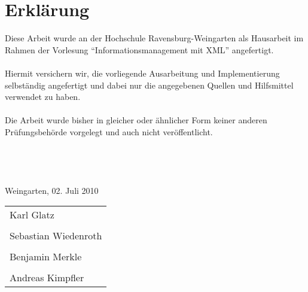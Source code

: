 \chapter*{Erklärung}
Diese Arbeit wurde an der Hochschule Ravensburg-Weingarten als Hausarbeit im Rahmen der Vorlesung ``\textsf{Informationsmanagement mit XML}'' angefertigt.
\\ \\
Hiermit versichern wir, die vorliegende Ausarbeitung und Implementierung selbständig angefertigt und dabei nur die angegebenen Quellen und Hilfsmittel verwendet zu haben.
\\ \\
Die Arbeit wurde bisher in gleicher oder ähnlicher Form keiner anderen Prüfungsbehörde vorgelegt und auch nicht veröffentlicht.
\\ \\ \\ \\ \\
Weingarten, 02. Juli 2010 \hspace{0.5cm}
\begin{tabular}[t]{p{4.5cm}}
 \\
 \hline
 Karl Glatz
 \\ \\
 \hline
 Sebastian Wiedenroth
 \\ \\
 \hline
 Benjamin Merkle
 \\ \\
 \hline
 Andreas Kimpfler
\end{tabular}